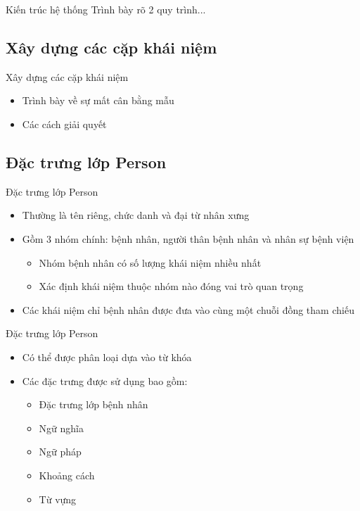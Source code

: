 \begin{frame}{Kiến trúc hệ thống}
\putlogo
Trình bày rõ 2 quy trình...
\end{frame}

\subsection{Xây dựng các cặp khái niệm}
\begin{frame}{Xây dựng các cặp khái niệm}
\putlogo
\begin{itemize}
\item Trình bày về sự mất cân bằng mẫu
\item Các cách giải quyết
\end{itemize}
\end{frame}

\subsection{Đặc trưng lớp Person}
\begin{frame}{Đặc trưng lớp Person}
\putlogo
\begin{itemize}
	\item Thường là tên riêng, chức danh và đại từ nhân xưng
	\item Gồm 3 nhóm chính: bệnh nhân, người thân bệnh nhân và nhân sự bệnh viện
	\begin{itemize}
		\item Nhóm bệnh nhân có số lượng khái niệm nhiều nhất
		\item Xác định khái niệm thuộc nhóm nào đóng vai trò quan trọng
	\end{itemize}
	\item Các khái niệm chỉ bệnh nhân được đưa vào cùng một chuỗi đồng tham chiếu
\end{itemize}
\end{frame}

\begin{frame}{Đặc trưng lớp Person}
\begin{itemize}
	\item Có thể được phân loại dựa vào {\color{red} từ khóa}
	\item Các đặc trưng được sử dụng bao gồm:
	\begin{itemize}
		\item Đặc trưng lớp bệnh nhân
		\item Ngữ nghĩa
		\item Ngữ pháp
		\item Khoảng cách
		\item Từ vựng
	\end{itemize}	
\end{itemize}
\end{frame}


